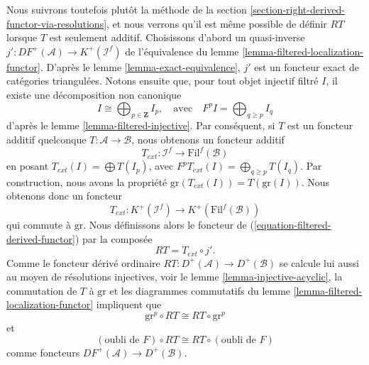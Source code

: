 \medskip\noindent
Nous suivrons toutefois plutôt la méthode de la
section \ref{section-right-derived-functor-via-resolutions}, et nous verrons
qu'il est même possible de définir $RT$ lorsque $T$ est seulement additif.
Choisissons d'abord un quasi-inverse
$j' : DF^{+}(\mathcal{A}) \to K^{+}(\mathcal{I}^f)$ de l'équivalence du
lemme \ref{lemma-filtered-localization-functor}.
D'après le lemme \ref{lemma-exact-equivalence}, $j'$ est un foncteur exact de
catégories triangulées. Notons ensuite que, pour tout objet injectif filtré
$I$, il existe une décomposition non canonique
\begin{equation}
\label{equation-decompose}
I \cong \bigoplus\nolimits_{p \in \mathbf{Z}} I_p,
\quad\text{avec}\quad
F^pI = \bigoplus\nolimits_{q \geq p} I_q
\end{equation}
d'après le lemme \ref{lemma-filtered-injective}.
Par conséquent, si $T$ est un foncteur additif quelconque
$T : \mathcal{A} \to \mathcal{B}$, nous obtenons un foncteur additif
\begin{equation}
\label{equation-extend-T}
T_{ext} : \mathcal{I}^f \to \text{Fil}^f(\mathcal{B})
\end{equation}
en posant $T_{ext}(I) = \bigoplus T(I_p)$, avec
$F^pT_{ext}(I) = \bigoplus_{q \geq p} T(I_q)$. Par construction, nous avons la
propriété $\text{gr}(T_{ext}(I)) = T(\text{gr}(I))$.
Nous obtenons donc un foncteur
\begin{equation}
\label{equation-extend-T-complexes}
T_{ext} : K^{+}(\mathcal{I}^f) \to K^{+}(\text{Fil}^f(\mathcal{B}))
\end{equation}
qui commute à $\text{gr}$. Nous définissons alors le foncteur de
(\ref{equation-filtered-derived-functor}) par la composée
\begin{equation}
\label{equation-definition-filtered-derived-functor}
RT = T_{ext} \circ j'.
\end{equation}
Comme le foncteur dérivé ordinaire
$RT : D^{+}(\mathcal{A}) \to D^{+}(\mathcal{B})$ se calcule lui aussi au moyen
de résolutions injectives, voir le
lemme \ref{lemma-injective-acyclic}, la commutation de $T$ à $\text{gr}$ et
les diagrammes commutatifs du
lemme \ref{lemma-filtered-localization-functor} impliquent que
\begin{equation}
\label{equation-commute-gr}
\text{gr}^p \circ RT \cong RT \circ \text{gr}^p
\end{equation}
et
\begin{equation}
\label{equation-commute-forget}
(\text{oubli de }F) \circ RT \cong RT \circ (\text{oubli de }F)
\end{equation}
comme foncteurs $DF^{+}(\mathcal{A}) \to D^{+}(\mathcal{B})$.

